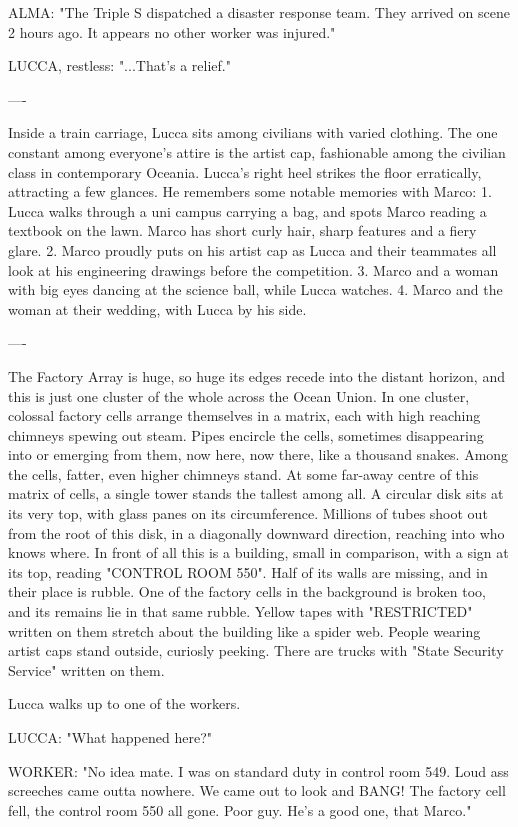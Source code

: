 \documentclass[11pt]{article}
\begin{document}
ALMA: "The Triple S dispatched a disaster response team. They arrived on scene 2 hours ago. 
It appears no other worker was injured."

LUCCA, restless: "...That's a relief."

----

Inside a train carriage, Lucca sits among civilians with varied clothing. 
The one constant among everyone's attire is the artist cap, fashionable among the civilian class in contemporary Oceania.
Lucca's right heel strikes the floor erratically, attracting a few glances. 
He remembers some notable memories with Marco: 
1. Lucca walks through a uni campus carrying a bag, and spots Marco reading a textbook on the lawn.
Marco has short curly hair, sharp features and a fiery glare. 
2. Marco proudly puts on his artist cap as Lucca and their teammates all look at his engineering drawings before the competition. 
3. Marco and a woman with big eyes dancing at the science ball, while Lucca watches.
4. Marco and the woman at their wedding, with Lucca by his side. 

----

The Factory Array is huge, so huge its edges recede into the distant horizon, and this is just one cluster of the whole across the Ocean Union. 
In one cluster, colossal factory cells arrange themselves in a matrix, each with high reaching chimneys spewing out steam. 
Pipes encircle the cells, sometimes disappearing into or emerging from them, now here, now there, like a thousand snakes. 
Among the cells, fatter, even higher chimneys stand. 
At some far-away centre of this matrix of cells, a single tower stands the tallest among all.
A circular disk sits at its very top, with glass panes on its circumference. 
Millions of tubes shoot out from the root of this disk, in a diagonally downward direction, reaching into who knows where. 
In front of all this is a building, small in comparison, with a sign at its top, reading "CONTROL ROOM 550".
Half of its walls are missing, and in their place is rubble. 
One of the factory cells in the background is broken too, and its remains lie in that same rubble. 
Yellow tapes with "RESTRICTED" written on them stretch about the building like a spider web.
People wearing artist caps stand outside, curiosly peeking. 
There are trucks with "State Security Service" written on them. 

Lucca walks up to one of the workers. 

LUCCA: "What happened here?"

WORKER: "No idea mate. I was on standard duty in control room 549. Loud ass screeches came outta nowhere. We came out to look and BANG! 
The factory cell fell, the control room 550 all gone. Poor guy. He's a good one, that Marco."
\end{document}
